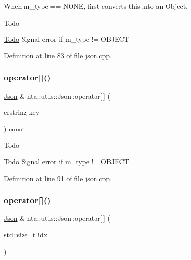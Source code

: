 When m\+\_\+type == N\+O\+NE, first converts this into an Object. 

\begin{DoxyRefDesc}{Todo}
\item[\hyperlink{todo__todo000017}{Todo}]Signal error if m\+\_\+type != O\+B\+J\+E\+CT \end{DoxyRefDesc}


Definition at line 83 of file json.\+cpp.

\mbox{\label{classnta_1_1utils_1_1Json_ab3b51a07ebed90330c98fd8e20785781}} 
\subsubsection{\texorpdfstring{operator[]()}{operator[]()}\hspace{0.1cm}{\footnotesize\ttfamily [2/4]}}
{\footnotesize\ttfamily \hyperlink{classnta_1_1utils_1_1Json}{Json} \& nta\+::utils\+::\+Json\+::operator\mbox{[}$\,$\mbox{]} (\begin{DoxyParamCaption}\item[{crstring}]{key }\end{DoxyParamCaption}) const}

\begin{DoxyRefDesc}{Todo}
\item[\hyperlink{todo__todo000018}{Todo}]Signal error if m\+\_\+type != O\+B\+J\+E\+CT \end{DoxyRefDesc}


Definition at line 91 of file json.\+cpp.

\mbox{\label{classnta_1_1utils_1_1Json_a236b5885612b74c21fbad169b21eaf55}} 
\subsubsection{\texorpdfstring{operator[]()}{operator[]()}\hspace{0.1cm}{\footnotesize\ttfamily [3/4]}}
{\footnotesize\ttfamily \hyperlink{classnta_1_1utils_1_1Json}{Json} \& nta\+::utils\+::\+Json\+::operator\mbox{[}$\,$\mbox{]} (\begin{DoxyParamCaption}\item[{std\+::size\+\_\+t}]{idx }\end{DoxyParamCaption})}

